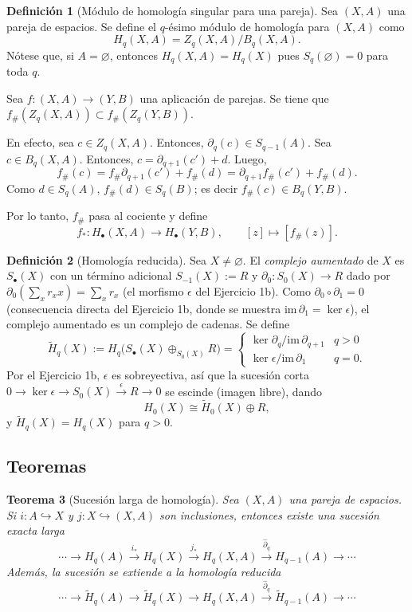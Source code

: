 \documentclass[11pt,a4paper]{article}
\theoremstyle{plain}
\newtheorem{theorem}{Teorema}[section]
\theoremstyle{definition}
\newtheorem{definition}[theorem]{Definición}
\theoremstyle{remark}
\begin{document}
\begin{definition}[Módulo de homología singular para una pareja]
\label{def:homologia-pareja}
Sea $(X,A)$ una pareja de espacios. Se define el $q$-ésimo módulo de
homología para $(X,A)$ como
\[
H_q(X,A)=Z_q(X,A)/B_q(X,A).
\]
Nótese que, si $A=\varnothing$, entonces $H_q(X,A)=H_q(X)$ pues
$S_q(\varnothing)=0$ para toda $q$.

Sea $f:(X,A)\to(Y,B)$ una aplicación de parejas. Se tiene que
$f_\#(Z_q(X,A))\subset f_\#(Z_q(Y,B))$.

En efecto, sea $c\in Z_q(X,A)$. Entonces, $\partial_q(c)\in S_{q-1}(A)$.
Sea $c\in B_q(X,A)$. Entonces, $c=\partial_{q+1}(c')+d$. Luego,
\[
f_\#(c)=f_\#\partial_{q+1}(c')+f_\#(d)=\partial_{q+1}f_\#(c')+f_\#(d).
\]
Como $d\in S_q(A)$, $f_\#(d)\in S_q(B)$; es decir $f_\#(c)\in B_q(Y,B)$.

Por lo tanto, $f_\#$ pasa al cociente y define
\[
f_*:H_\bullet(X,A)\to H_\bullet(Y,B), \qquad [z]\mapsto[f_\#(z)].
\]
\end{definition}

\begin{definition}[Homología reducida]
\label{def:homologia-reducida}
Sea $X\ne\varnothing$. El \emph{complejo aumentado} de $X$ es
$S_\bullet(X)$ con un término adicional $S_{-1}(X):=R$ y
$\partial_0:S_0(X)\to R$ dado por $\partial_0\left(\sum_xr_xx\right)=\sum_xr_x$
(el morfismo $\epsilon$ del Ejercicio 1b). Como $\partial_0\circ\partial_1=0$
(consecuencia directa del Ejercicio 1b, donde se muestra
$\mathrm{im}\,\partial_1=\ker\epsilon$), el complejo aumentado es un
complejo de cadenas. Se define
\[
\tilde H_q(X):=H_q\big(S_\bullet(X)\oplus_{S_0(X)}R\big)=\begin{cases}
\ker\partial_q/\mathrm{im}\,\partial_{q+1} & q>0\\
\ker\epsilon/\mathrm{im}\,\partial_1 & q=0.
\end{cases}
\]
Por el Ejercicio 1b, $\epsilon$ es sobreyectiva, así que la sucesión corta
$0\to\ker\epsilon\to S_0(X)\xrightarrow{\epsilon}R\to0$ se escinde (imagen
libre), dando
\[
H_0(X)\cong\tilde H_0(X)\oplus R,
\]
y $\tilde H_q(X)=H_q(X)$ para $q>0$.
\end{definition}

\subsection{Teoremas}

\begin{theorem}[Sucesión larga de homología]
\label{thm:sucesion-larga}
Sea $(X,A)$ una pareja de espacios. Si $i:A\hookrightarrow X$ y
$j:X\hookrightarrow(X,A)$ son inclusiones, entonces existe una sucesión
exacta larga
\[
\cdots\to H_q(A)\xrightarrow{i_*}H_q(X)\xrightarrow{j_*}H_q(X,A)\xrightarrow{\hat\partial_q}H_{q-1}(A)\to\cdots
\]
Además, la sucesión se extiende a la homología reducida
\[
\cdots\to\tilde H_q(A)\to\tilde H_q(X)\to H_q(X,A)\xrightarrow{\hat\partial_q}\tilde H_{q-1}(A)\to\cdots
\]
\end{theorem}
\end{document}
